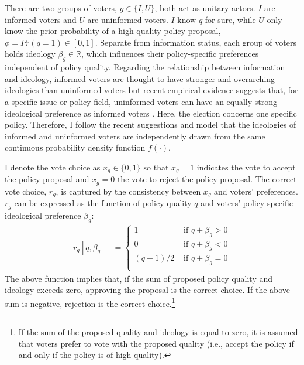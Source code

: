 \documentclass[letterpaper, 12pt]{article}
\begin{document}
    \par There are two groups of voters, $g \in \{I, U\}$, both act as unitary actors. $I$ are informed voters and $U$ are uninformed voters. $I$ know $q$ for sure, while $U$ only know the prior probability of a high-quality policy proposal, $\phi = Pr(q=1) \in [0, 1]$. Separate from information status, each group of voters holds ideology $\beta_g \in \mathbb{R}$, which influences their policy-specific preferences independent of policy quality. Regarding the relationship between information and ideology, informed voters are thought to have stronger and overarching ideologies than uninformed voters \citep{Converse1964thna, Achen2016defo} but recent empirical evidence suggests that, for a specific issue or policy field, uninformed voters can have an equally strong ideological preference as informed voters \citep{Goren2012onvo, Broockman2016apto}. Here, the election concerns one specific policy. Therefore, I follow the recent suggestions and model that the ideologies of informed and uninformed voters are independently drawn from the same continuous probability density function $f(\cdot)$.
    
    \par I denote the vote choice as $x_g \in \{0,1\}$ so that $x_g=1$ indicates the vote to accept the policy proposal and $x_g=0$ the vote to reject the policy proposal. The correct vote choice, $r_g$, is captured by the consistency between $x_g$ and voters' preferences. $r_g$ can be expressed as the function of policy quality $q$ and voters' policy-specific ideological preference $\beta_g$:
    \begin{align}
    r_g[q, \beta_g] &= \begin{cases}
    1 &\text{ if } q + \beta_g > 0 \\
    0 &\text{ if } q + \beta_g < 0  \\
    (q + 1)/2 &\text{ if } q + \beta_g = 0\\
    \end{cases}
    \end{align}
    \noindent The above function implies that, if the sum of proposed policy quality and ideology exceeds zero, approving the proposal is the correct choice. If the above sum is negative, rejection is the correct choice.\footnote{If the sum of the proposed quality and ideology is equal to zero, it is assumed that voters prefer to vote with the proposed quality (i.e., accept the policy if and only if the policy is of high-quality).}
    
\end{document}

